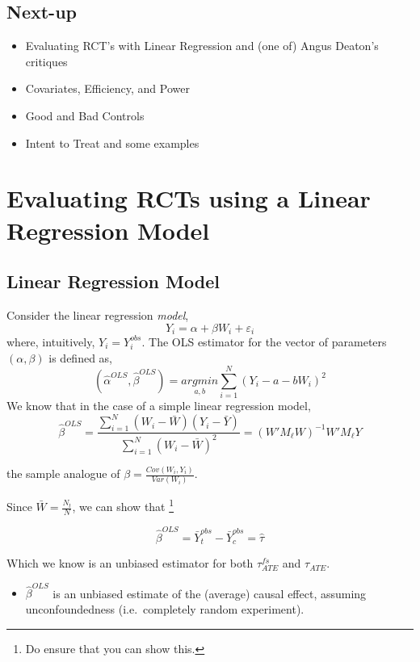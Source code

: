 \documentclass[
  letterpaper,
  DIV=11,
  numbers=noendperiod]{scrreprt}
\providecommand{\tightlist}{%
  \setlength{\itemsep}{0pt}\setlength{\parskip}{0pt}}\usepackage{longtable,booktabs,array}
\theoremstyle{definition}
\theoremstyle{remark}
\begin{document}
\subsection{Next-up}\label{next-up}

\begin{itemize}
\tightlist
\item
  Evaluating RCT's with Linear Regression and (one of) Angus Deaton's
  critiques
\item
  Covariates, Efficiency, and Power\\
\item
  Good and Bad Controls
\item
  Intent to Treat and some examples
\end{itemize}

\section{Evaluating RCTs using a Linear Regression
Model}\label{evaluating-rcts-using-a-linear-regression-model}

\subsection{Linear Regression Model}\label{linear-regression-model}

Consider the linear regression \emph{model}, \[
            Y_i = \alpha+\beta W_i + \varepsilon_i
\] where, intuitively, \(Y_i = Y^{obs}_i\). The OLS estimator for the
vector of parameters \((\alpha,\beta)\) is defined as, \[
            (\hat{\alpha}^{OLS},\hat{\beta}^{OLS}) = \underset{a,b}{argmin} \sum_{i=1}^{N}(Y_i-a-b W_i)^2
\] We know that in the case of a simple linear regression model, \[
            \hat{\beta}^{OLS} = \frac{\sum_{i=1}^{N}(W_i-\bar{W})(Y_i-\bar{Y})}{\sum_{i=1}^{N}(W_i-\bar{W})^2} = (W'M_\ell W)^{-1}W'M_\ell Y
\]

the sample analogue of \(\beta = \frac{Cov(W_i,Y_i)}{Var(W_i)}\).

Since \(\bar{W}=\frac{N_t}{N}\), we can show that \footnote{Do ensure
  that you can show this.}

\[
            \hat{\beta}^{OLS} = \bar{Y}^{obs}_t-\bar{Y}^{obs}_c = \hat{\tau}
\]

Which we know is an unbiased estimator for both \(\tau_{ATE}^{fs}\) and
\(\tau_{ATE}\).

\par

\begin{itemize}
\tightlist
\item
  \(\hat{\beta}^{OLS}\) is an unbiased estimate of the (average) causal
  effect, assuming unconfoundedness (i.e.~completely random experiment).
\end{itemize}
\end{document}
